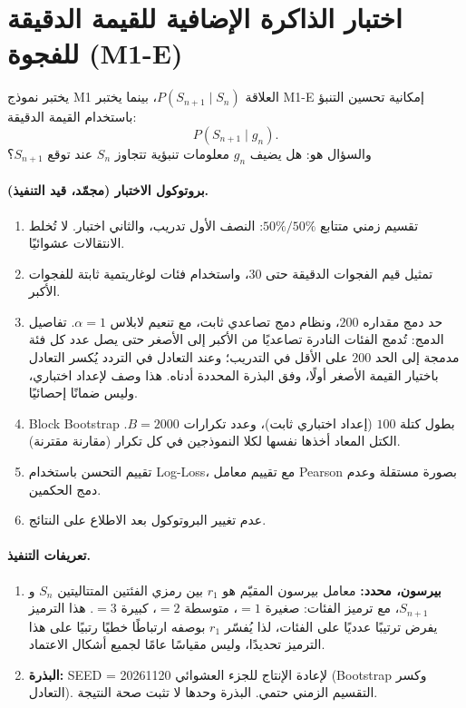 \documentclass[12pt,a4paper]{article}
\begin{document}
\section{اختبار الذاكرة الإضافية للقيمة الدقيقة للفجوة (\textenglish{M1-E})}
يختبر نموذج \textenglish{M1} العلاقة $P(S_{n+1}\mid S_n)$، بينما يختبر \textenglish{M1-E} إمكانية تحسين التنبؤ باستخدام القيمة الدقيقة:
\[
P(S_{n+1}\mid g_n).
\]
والسؤال هو: هل يضيف $g_n$ معلومات تنبؤية تتجاوز $S_n$ عند توقع $S_{n+1}$؟
\paragraph{بروتوكول الاختبار (مجمّد، قيد التنفيذ).}
\begin{enumerate}
    \item تقسيم زمني متتابع $50\%/50\%$: النصف الأول تدريب، والثاني اختبار. لا تُخلط الانتقالات عشوائيًا.
    \item تمثيل قيم الفجوات الدقيقة حتى $30$، واستخدام فئات لوغاريتمية ثابتة للفجوات الأكبر.
    \item حد دمج مقداره $200$، ونظام دمج تصاعدي ثابت، مع تنعيم لابلاس $\alpha=1$. تفاصيل الدمج: تُدمج الفئات النادرة تصاعديًا من الأكبر إلى الأصغر حتى يصل عدد كل فئة مدمجة إلى الحد $200$ على الأقل في التدريب؛ وعند التعادل في التردد يُكسر التعادل باختيار القيمة الأصغر أولًا، وفق البذرة المحددة أدناه. هذا وصف لإعداد اختباري، وليس ضمانًا إحصائيًا.
    \item \textenglish{Block Bootstrap} بطول كتلة $100$ (إعداد اختباري ثابت)، وعدد تكرارات $B=2000$. الكتل المعاد أخذها نفسها لكلا النموذجين في كل تكرار (مقارنة مقترنة).
    \item تقييم التحسن باستخدام \textenglish{Log-Loss}، مع تقييم معامل \textenglish{Pearson} بصورة مستقلة وعدم دمج الحكمين.
    \item عدم تغيير البروتوكول بعد الاطلاع على النتائج.
\end{enumerate}
\paragraph{تعريفات التنفيذ.}
\begin{enumerate}
    \item \textbf{بيرسون، محدد:} معامل بيرسون المقيّم هو $r_1$ بين رمزي الفئتين المتتاليتين $S_n$ و $S_{n+1}$، مع ترميز الفئات: صغيرة $=1$، متوسطة $=2$، كبيرة $=3$. هذا الترميز يفرض ترتيبًا عدديًا على الفئات، لذا يُفسّر $r_1$ بوصفه ارتباطًا خطيًا رتبيًا على هذا الترميز تحديدًا، وليس مقياسًا عامًا لجميع أشكال الاعتماد.
    \item \textbf{البذرة:} \textenglish{SEED = 20261120} لإعادة الإنتاج للجزء العشوائي (Bootstrap وكسر التعادل). التقسيم الزمني حتمي. البذرة وحدها لا تثبت صحة النتيجة.
\end{enumerate}
\end{document}
